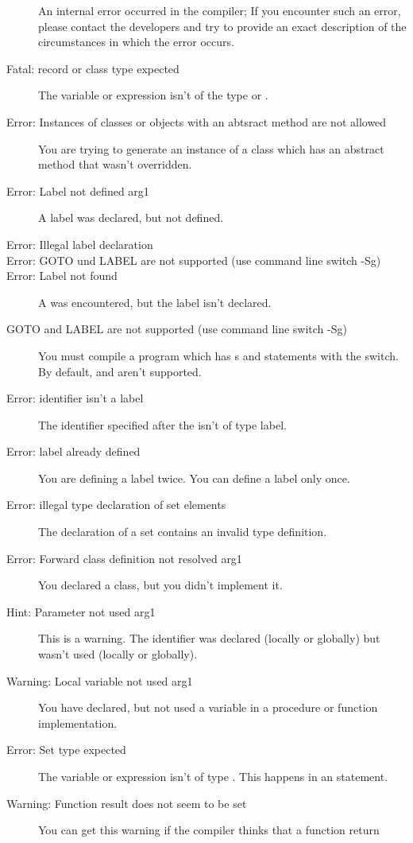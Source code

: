 \begin{description}
 An internal error occurred in the compiler; If you encounter such an error,
 please contact the developers and try to provide  an exact description of
 the circumstances in which the error occurs.
\item [Fatal: record or class type expected]
 The variable or expression isn't of the type  or .
\item [Error: Instances of classes or objects with an abtsract method are not allowed]
 You are trying to generate an instance of a class which has an abstract
 method that wasn't overridden.
\item [Error: Label not defined arg1]
 A label was declared, but not defined.
\item [Error: Illegal label declaration]
\item [Error: GOTO und LABEL are not supported (use command line switch -Sg)]
\item [Error: Label not found]
 A  was encountered, but the label isn't declared. 
 \item [GOTO and LABEL are not supported (use command line switch -Sg)]
 You must compile a program which has s and  statements 
 with the   switch. By default,  and  aren't
 supported.
\item [Error: identifier isn't a label]
 The identifier specified after the  isn't of type label.
\item [Error: label already defined]
 You are defining a label twice. You can define a label only once.
\item [Error: illegal type declaration of set elements]
 The declaration of a set contains an invalid type definition.
\item [Error: Forward class definition not resolved arg1]
 You declared a class, but you didn't implement it.
\item [Hint: Parameter not used arg1]
 This is a warning. The identifier was declared (locally or globally) but
 wasn't used (locally or globally).
\item [Warning: Local variable not used arg1]
 You have declared, but not used a variable in a procedure or function
 implementation.
\item [Error: Set type expected]
 The variable or expression isn't of type . This happens in an
  statement.
\item [Warning: Function result does not seem to be set]
 You can get this warning if the compiler thinks that a function return

\end{description}
